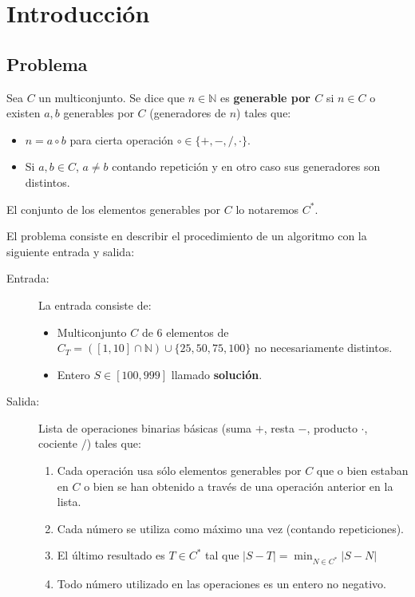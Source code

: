 \section{Introducción}
\subsection{Problema}

\begin{definition}
	Sea $C$ un multiconjunto. Se dice que $n \in \mathbb{N}$ es \textbf{generable por $C$} si $n \in C$ o
	existen $a,b$ generables por $C$ (generadores de $n$) tales que:
	\begin{itemize}
		\item $n = a \circ b$ para cierta operación $\circ \in \{+,-,/,\cdot \}$.
		\item Si $a,b \in C$, $a \neq b$ contando repetición y en otro caso sus
		generadores son distintos.
	\end{itemize}
	El conjunto de los elementos generables por $C$ lo notaremos $C^{\ast}$.
\end{definition}

El problema consiste en describir el procedimiento de un algoritmo con la
siguiente entrada y salida:

\begin{description}
	\item[Entrada:] La entrada consiste de:
		\begin{itemize}
			\item Multiconjunto $C$ de 6 elementos de
			$C_T = ([1,10] \cap \mathbb N) \cup \{ 25, 50, 75, 100\}$
			no necesariamente distintos.
			\item Entero $S \in [100, 999]$ llamado \textbf{solución}.
		\end{itemize}

	\item[Salida:] Lista de operaciones binarias básicas (suma $+$, resta $-$,
	producto $\cdot$, cociente $/$) tales que:
	\begin{enumerate}
		\item Cada operación usa sólo elementos generables por $C$ que o bien estaban
		 en $C$ o bien se han obtenido a través de una operación anterior en la lista.
		\item Cada número se utiliza como máximo una vez (contando repeticiones).
		\item El último resultado es $T \in C^{\ast}$ tal que
		$|S-T| = \displaystyle \min_{N \in C^{\ast}} |S-N|$
		\item Todo número utilizado en las operaciones es un entero no negativo.
	\end{enumerate}
\end{description}


